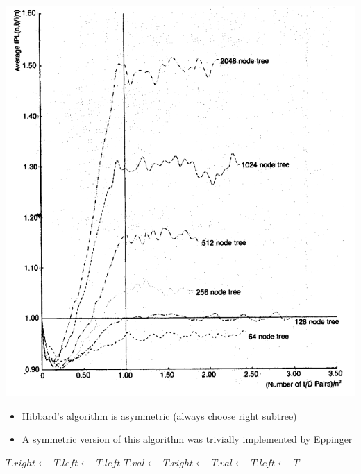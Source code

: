 \documentclass{beamer}
\begin{document}
\begin{frame}[plain]
    \begin{center}
        \includegraphics[width=\paperwidth,height=\paperheight,keepaspectratio]{plotEppinger.png}
    \end{center}
\end{frame}

\begin{frame}
    \begin{itemize}
        \item Hibbard's algorithm is asymmetric (always choose right subtree)
            \pause
        \item A symmetric version of this algorithm was trivially implemented by Eppinger
    \end{itemize}
\end{frame}

\begin{frame}
    \footnotesize
    \begin{algorithmic}
        \State $T.right \gets$ 
        \State $T.left \gets$ 
        \Else
        \State \Return $T.left$
        \Else
        \State $T.val \gets$ 
        \State $T.right \gets$ 
        \Else
        \State $T.val \gets$ 
        \State $T.left \gets$ 
        \EndIf
        \EndIf
        \EndIf
        \State \Return $T$
        \EndFunction
    \end{algorithmic}
\end{frame}
\end{document}
